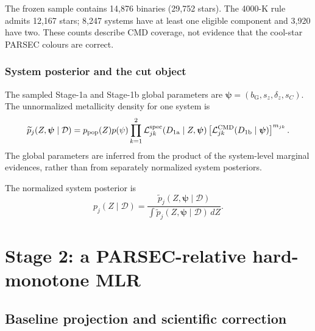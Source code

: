 The frozen sample contains 14,876 binaries (29,752 stars).  The 4000-K rule
admits 12,167 stars; 8,247 systems have at least one eligible component and
3,920 have two.  These counts describe CMD coverage, not evidence that the
cool-star PARSEC colours are correct.

\subsubsection{System posterior and the cut object}

The sampled Stage-1a and Stage-1b global parameters are 
$\bm\psi=(b_{\mathrm{G}},s_z,\delta_z,s_C)$.  The unnormalized metallicity density for one system is
\begin{equation}
 \widetilde p_j(Z,\bm\psi \mid \mathcal{D})
 =p_{\rm pop}(Z) p(\psi)
 \prod_{k=1}^{2}\mathcal{L}^{\rm spec}_{jk}
 (D_{\rm 1a}\mid Z,\bm\psi)
 \left[\mathcal{L}^{\rm CMD}_{jk}(D_{\rm 1b}\mid \bm\psi)\right]^{m_{jk}}.
 \label{eq:zpost-cont}
\end{equation}
The global parameters are inferred from the product of the system-level marginal evidences, rather than from separately normalized system posteriors.

The normalized system posterior is
\begin{equation}
 p_j(Z\mid\mathcal{D})=\dfrac{\widetilde p_j(Z,\bm\psi\mid\mathcal{D})}
 {\int{\widetilde p_j(Z,\bm\psi\mid\mathcal{D})\,dZ}}.
 \label{eq:zpost}
\end{equation}   

\section{Stage 2: a PARSEC-relative hard-monotone MLR}
\label{sec:mlr}

\subsection{Baseline projection and scientific correction}

